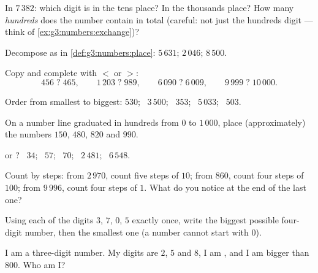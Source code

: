 \begin{exercise}[$\star$]\label{exo:g3:numbers:3}
In $7\,382$: which digit is in the tens place? In the thousands
place? How many \emph{hundreds} does the number contain in total
(careful: not just the hundreds digit --- think of
\cref{ex:g3:numbers:exchange})?
\end{exercise}

\begin{exercise}[$\star$]\label{exo:g3:numbers:4}
Decompose as in \cref{def:g3:numbers:place}:
$5\,631$; \quad $2\,046$; \quad $8\,500$.
\end{exercise}

\begin{exercise}[$\star$]\label{exo:g3:numbers:5}
Copy and complete with $<$ or $>$:
\[
456 \;?\; 465, \qquad
1\,203 \;?\; 989, \qquad
6\,090 \;?\; 6\,009, \qquad
9\,999 \;?\; 10\,000 .
\]
\end{exercise}

\begin{exercise}[$\star$]\label{exo:g3:numbers:6}
Order from smallest to biggest: $530$; \ $3\,500$; \ $353$; \ $5\,033$;
\ $503$.
\end{exercise}

\begin{exercise}[$\star$]\label{exo:g3:numbers:7}
On a number line graduated in hundreds from $0$ to $1\,000$, place
(approximately) the numbers $150$, $480$, $820$ and $990$.
\end{exercise}

\begin{exercise}[$\star$]\label{exo:g3:numbers:8}
 or ? \ $34$; \ $57$; \ $70$; \ $2\,481$; \ $6\,548$.
\end{exercise}

\begin{exercise}[$\star$]\label{exo:g3:numbers:9}
Count by steps: from $2\,970$, count five steps of $10$; from $860$,
count four steps of $100$; from $9\,996$, count four steps of $1$.
What do you notice at the end of the last one?
\end{exercise}

\begin{exercise}[$\star\star$]\label{exo:g3:numbers:10}
Using each of the digits $3$, $7$, $0$, $5$ exactly once, write the
biggest possible four-digit number, then the smallest one (a number
cannot start with $0$).
\end{exercise}

\begin{exercise}[$\star\star$]\label{exo:g3:numbers:11}
I am a three-digit number. My digits are $2$, $5$ and $8$, I am ,
and I am bigger than $800$. Who am I?
\end{exercise}
